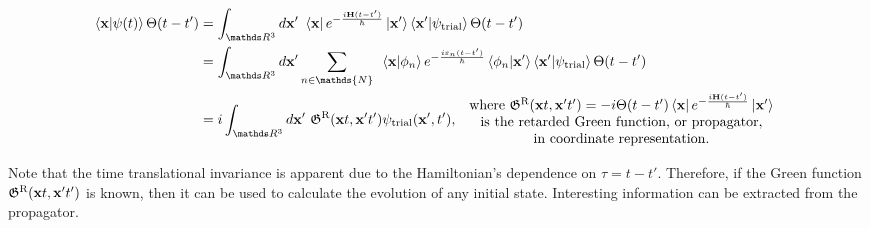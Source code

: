 \documentclass{homework}
\begin{document}
\begin{equation}
    \begin{split}
        \bra{{\bf x}} \ket{\psi(t)} \Theta(t-t') &= \int_{\R^3} d{\bf x}' \blanky \bra{{\bf x}} e^{-\frac{i {\bf H} (t-t')}{\hbar}} \ket{{\bf x}'}\bra{{\bf x}'} \ket{\psi_{\textnormal{trial}}} \Theta(t-t') \\
        &=  \int_{\R^3} d{\bf x}' \sum_{n \in \mathds{N}} \blanky \bra{{\bf x}} \ket{\phi_n} e^{-\frac{i \varepsilon_n (t-t')}{\hbar}} \bra{\phi_n}\ket{{\bf x}'}\bra{{\bf x}'} \ket{\psi_{\textnormal{trial}}} \Theta(t-t') \\
        &= i \int_{\R^3} d{\bf x}' \blanky \mathfrak{G}^{\textnormal{R}}({\bf x}t, {\bf x}'t') \psi_{\textnormal{trial}}({\bf x}', t'), \begin{array}{c}
             \textnormal{ where } \mathfrak{G}^{\textnormal{R}}({\bf x}t, {\bf x}'t') = - i \Theta(t-t') \bra{{\bf x}} e^{-\frac{i {\bf H} (t-t')}{\hbar}} \ket{{\bf x}'} \\
             \textnormal{ is the retarded Green function, or propagator,} \\
             \textnormal{ in coordinate representation.}
        \end{array}
    \end{split} 
    \label{NR-1particle-GF}
\end{equation}

Note that the time translational invariance is apparent due to the Hamiltonian's dependence on $\tau = t-t'$. Therefore, if the Green function $\mathfrak{G}^{\textnormal{R}}({\bf x}t, {\bf x}'t')$ is known, then it can be used to calculate the evolution of any initial state. Interesting information can be extracted from the propagator. 
\end{document}
